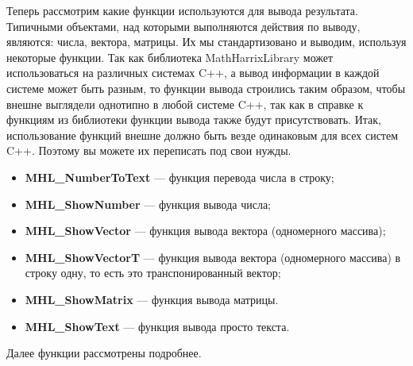 \documentclass[a4paper,12pt]{article}
\begin{document}
Теперь рассмотрим какие функции используются для вывода результата. Типичными объектами, над которыми выполняются действия по выводу, являются: числа, вектора, матрицы. Их мы стандартизовано и выводим, используя некоторые функции. Так как библиотека MathHarrixLibrary может использоваться на различных системах C++, а вывод информации в каждой системе может быть разным, то функции вывода строились таким образом, чтобы внешне выглядели однотипно в любой системе C++, так как в справке к функциям из библиотеки функции вывода также будут присутствовать. Итак, использование функций внешне должно быть везде одинаковым для всех систем C++.  Поэтому вы можете их переписать под свои нужды.


\begin{itemize}
\item \textbf{MHL\_NumberToText} --- функция перевода числа в строку; 
\item \textbf{MHL\_ShowNumber} --- функция вывода числа;
\item \textbf{MHL\_ShowVector} --- функция вывода вектора (одномерного массива);
\item \textbf{MHL\_ShowVectorT} --- функция вывода вектора (одномерного массива) в строку одну, то есть это транспонированный вектор;
\item \textbf{MHL\_ShowMatrix} --- функция вывода матрицы.
\item \textbf{MHL\_ShowText} --- функция вывода просто текста.
\end{itemize}

Далее функции рассмотрены подробнее.
\end{document}
